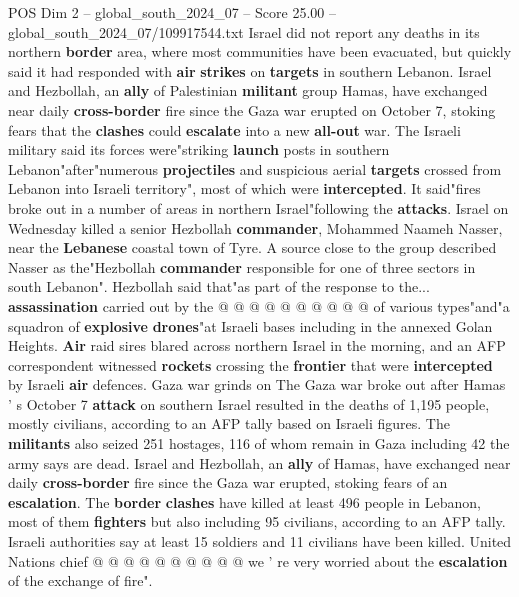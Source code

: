 \begin{textsample}{POS Dim 2 – global\_south\_2024\_07 – Score 25.00 – global\_south\_2024\_07/109917544.txt}  \label{ex:f2_pos_068}
Israel did not report any deaths in its northern \textbf{border} area, where most communities have been evacuated, but quickly said it had responded with \textbf{air} \textbf{strikes} on \textbf{targets} in southern Lebanon.
Israel and Hezbollah, an \textbf{ally} of Palestinian \textbf{militant} group Hamas, have exchanged near daily \textbf{cross-border} fire since the Gaza war erupted on October 7, stoking fears that the \textbf{clashes} could \textbf{escalate} into a new \textbf{all-out} war.
The Israeli military said its forces were"striking \textbf{launch} posts in southern Lebanon"after"numerous \textbf{projectiles} and suspicious aerial \textbf{targets} crossed from Lebanon into Israeli territory", most of which were \textbf{intercepted}.
It said"fires broke out in a number of areas in northern Israel"following the \textbf{attacks}.
Israel on Wednesday killed a senior Hezbollah \textbf{commander}, Mohammed Naameh Nasser, near the \textbf{Lebanese} coastal town of Tyre.
A source close to the group described Nasser as the"Hezbollah \textbf{commander} responsible for one of three sectors in south Lebanon".
Hezbollah said that"as part of the response to the... \textbf{assassination} carried out by the @ @ @ @ @ @ @ @ @ @ of various types"and"a squadron of \textbf{explosive} \textbf{drones}"at Israeli bases including in the annexed Golan Heights. \textbf{Air} raid sires blared across northern Israel in the morning, and an AFP correspondent witnessed \textbf{rockets} crossing the \textbf{frontier} that were \textbf{intercepted} by Israeli \textbf{air} defences.
Gaza war grinds on The Gaza war broke out after Hamas ' s October 7 \textbf{attack} on southern Israel resulted in the deaths of 1,195 people, mostly civilians, according to an AFP tally based on Israeli figures.
The \textbf{militants} also seized 251 hostages, 116 of whom remain in Gaza including 42 the army says are dead.
Israel and Hezbollah, an \textbf{ally} of Hamas, have exchanged near daily \textbf{cross-border} fire since the Gaza war erupted, stoking fears of an \textbf{escalation}.
The \textbf{border} \textbf{clashes} have killed at least 496 people in Lebanon, most of them \textbf{fighters} but also including 95 civilians, according to an AFP tally.
Israeli authorities say at least 15 soldiers and 11 civilians have been killed.
United Nations chief @ @ @ @ @ @ @ @ @ @ we ' re very worried about the \textbf{escalation} of the exchange of fire".

\end{textsample}
